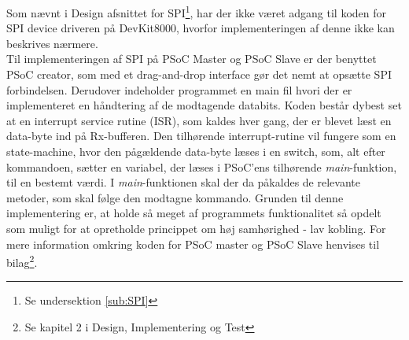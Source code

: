 Som nævnt i Design afsnittet for SPI\footnote{Se undersektion \ref{sub:SPI}}, har der ikke været adgang til koden for SPI device driveren på DevKit8000, hvorfor implementeringen
af denne ikke kan beskrives nærmere. \\

Til implementeringen af SPI på PSoC Master og PSoC Slave er der benyttet PSoC creator, som med et drag-and-drop interface gør det nemt at opsætte SPI forbindelsen. 
Derudover indeholder programmet en main fil hvori der er implementeret en håndtering af de modtagende databits. Koden består dybest set at en interrupt service 
rutine (ISR), som kaldes hver gang, der er blevet læst en data-byte ind på Rx-bufferen. Den tilhørende interrupt-rutine vil fungere som en state-machine, 
hvor den pågældende data-byte læses i en switch, som, alt efter kommandoen, sætter en variabel, der læses i PSoC'ens tilhørende \textit{main}-funktion, til en 
bestemt værdi. I \textit{main}-funktionen skal der da påkaldes de relevante metoder, som skal følge den modtagne kommando. Grunden til denne implementering er, 
at holde så meget af programmets funktionalitet så opdelt som muligt for at opretholde princippet om høj samhørighed - lav kobling. For mere information omkring 
koden for PSoC master og PSoC Slave henvises til bilag\footnote{Se kapitel 2 i Design, Implementering og Test}.